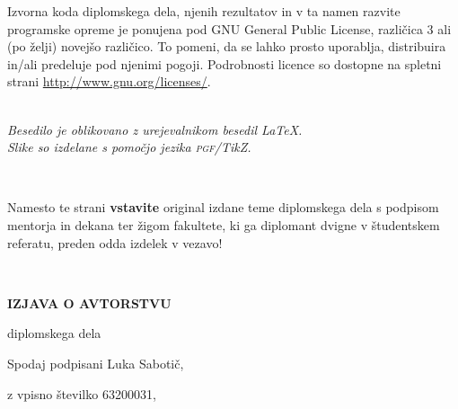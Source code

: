 \documentclass[12pt,a4paper,openany]{book}
\newcommand{\pgfname}{\textsc{pgf}}
\newcommand{\tikzname}{Ti\emph{k}Z}
\begin{document}
\vspace*{1.5cm}
{\small \noindent
Izvorna koda diplomskega dela, njenih rezultatov in v ta namen razvite programske opreme je ponujena pod GNU General Public License,
različica 3 ali (po želji) novejšo različico. To pomeni, da se lahko prosto uporablja, distribuira in/ali predeluje pod njenimi pogoji.
Podrobnosti licence so dostopne na spletni strani \url{http://www.gnu.org/licenses/}.
}

\begin{center} 
\ \\ \vfill
{\em
Besedilo je oblikovano z urejevalnikom besedil \LaTeX. \\ Slike so izdelane s pomočjo jezika \pgfname/\tikzname.}
\end{center}

\newpage

\ \thispagestyle{empty}

\newpage


\thispagestyle{empty}

Namesto te strani {\bf vstavite} original izdane teme diplomskega dela s podpisom mentorja in dekana ter \v zigom fakultete, ki ga diplomant
dvigne v študent\-skem referatu,  preden odda izdelek v vezavo!

\newpage


\ \thispagestyle{empty}

\newpage



\thispagestyle{empty}

\vspace{1cm}
\begin{center} 
{\Large \textbf{IZJAVA O AVTORSTVU}}
\end{center}

\begin{center} 
{\Large diplomskega dela}
\end{center}

\vspace{1cm}
Spodaj podpisani \hspace{0.5cm} Luka Sabotič,

\vspace{0.5cm}
z vpisno številko \hspace{0.5cm} 63200031,
\end{document}
